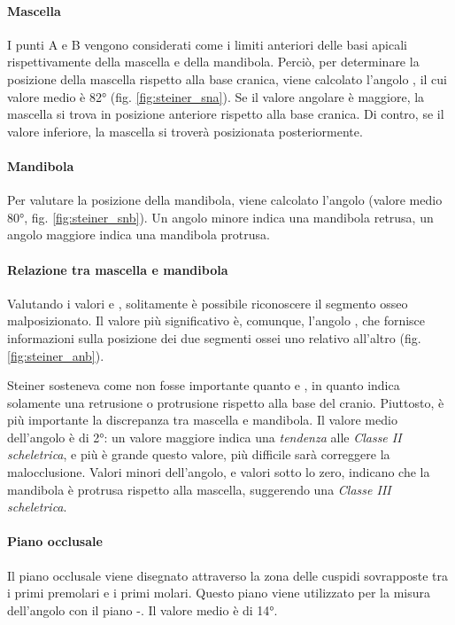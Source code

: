 \paragraph{Mascella}
I punti A e B vengono considerati come i limiti anteriori delle basi apicali rispettivamente della mascella e della mandibola. Perciò, per determinare la posizione della mascella rispetto alla base cranica, viene calcolato l'angolo , il cui valore medio è 82° (fig. \vref{fig:steiner_sna}). Se il valore angolare è maggiore, la mascella si trova in posizione anteriore rispetto alla base cranica. Di contro, se il valore inferiore, la mascella si troverà posizionata posteriormente.

\paragraph{Mandibola}
Per valutare la posizione della mandibola, viene calcolato l'angolo  (valore medio 80°, fig. \ref{fig:steiner_snb}). Un angolo minore indica una mandibola retrusa, un angolo maggiore indica una mandibola protrusa.

\paragraph{Relazione tra mascella e mandibola}
Valutando i valori  e , solitamente è possibile riconoscere il segmento osseo malposizionato. Il valore più significativo è, comunque, l'angolo , che fornisce informazioni sulla posizione dei due segmenti ossei uno relativo all'altro (fig. \vref{fig:steiner_anb}).

Steiner sosteneva come  non fosse importante quanto  e , in quanto indica solamente una retrusione o protrusione rispetto alla base del cranio. Piuttosto, è più importante la discrepanza tra mascella e mandibola. Il valore medio dell'angolo  è di 2°: un valore maggiore indica una \textit{tendenza} alle \textit{Classe II scheletrica}, e più è grande questo valore, più difficile sarà correggere la malocclusione. Valori minori dell'angolo, e valori sotto lo zero, indicano che la mandibola è protrusa rispetto alla mascella, suggerendo una \textit{Classe III scheletrica}.

\paragraph{Piano occlusale}
Il piano occlusale viene disegnato attraverso la zona delle cuspidi sovrapposte tra i primi premolari e i primi molari. Questo piano viene utilizzato per la misura dell'angolo con il piano -. Il valore medio è di 14°.

